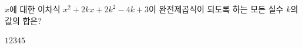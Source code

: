 $x$에 대한 이차식 $x^2+2kx+2k^2-4k+3$이 완전제곱식이 되도록 하는 모든 실수 $k$의 값의 합은?
\begin{choices32}{$1$}{$2$}{$3$}{$4$}{$5$}\end{choices32}

